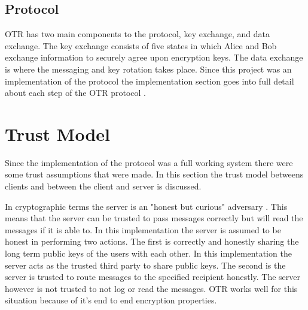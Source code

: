 \subsection{Protocol}


OTR has two main components to the protocol, key exchange, and data exchange. The key exchange consists of five states in which Alice and Bob exchange information to securely agree upon encryption keys. The data exchange is where the messaging and key rotation takes place.
Since this project was an implementation of the protocol the implementation section goes into full detail about each step of the OTR protocol \cite{otr-protocol}.


\section{Trust Model}


Since the implementation of the protocol was a full working system there were some trust assumptions that were made. In this section the trust model betweens clients and between the client and server is discussed. 


In cryptographic terms the server is an "honest but curious" adversary \cite{sjcl-paper}. This means that the server can be trusted to pass messages correctly but will read the messages if it is able to. In this implementation the server is assumed to be honest in performing two actions. The first is correctly and honestly sharing the long term public keys of the users with each other. In this implementation the server acts as the trusted third party to share public keys. The second is the server is trusted to route messages to the specified recipient honestly. The server however is not trusted to not log or read the messages. OTR works well for this situation because of it’s end to end encryption properties.

